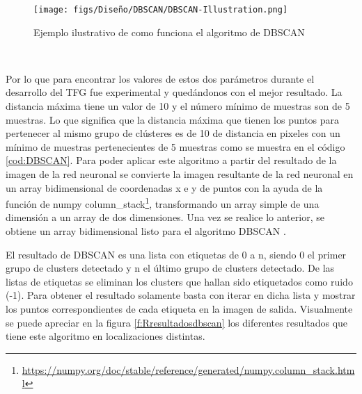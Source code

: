 \begin{figure} [H]
  \begin{center}
    \texttt{[image: figs/Diseño/DBSCAN/DBSCAN-Illustration.png]}
  \end{center}
  \caption{Ejemplo ilustrativo de como funciona el algoritmo de DBSCAN \cite{DBSCAN}}
  \label{fig:Ejemplo_DBSCAN}
\end{figure}\

Por lo que para encontrar los valores de estos dos parámetros durante el desarrollo del TFG fue experimental y quedándonos con el mejor resultado. La distancia máxima tiene un valor de 10 
y el número mínimo de muestras son de 5 muestras. Lo que significa que la distancia máxima que tienen los puntos para pertenecer al mismo grupo de clústeres es de 10 de distancia en pixeles
con un mínimo de muestras pertenecientes de 5 muestras como se muestra en el código \ref{cod:DBSCAN}. Para poder aplicar este algoritmo a partir del resultado de la imagen de la red neuronal se convierte la imagen resultante
de la red neuronal en un array bidimensional de coordenadas x e y de puntos con la ayuda de la función de numpy column\_stack\footnote{\url{https://numpy.org/doc/stable/reference/generated/numpy.column_stack.html}}, 
transformando un array simple de una dimensión a un array de dos dimensiones. Una vez se realice lo anterior, se obtiene un array bidimensional listo para el algoritmo DBSCAN .\newline

El resultado de DBSCAN es una lista con etiquetas de 0 a n, siendo 0 el primer grupo de clusters detectado y 
n el último grupo de clusters detectado. De las listas de etiquetas se eliminan los clusters que hallan sido etiquetados como ruido (-1). Para obtener el resultado solamente basta con iterar en dicha lista y mostrar los puntos correspondientes de cada etiqueta en la imagen de salida.
Visualmente se puede apreciar en la figura \ref{f:Rresultadosdbscan} los diferentes resultados que tiene este algoritmo en localizaciones distintas. 


